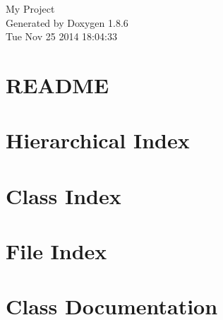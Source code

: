 \documentclass[twoside]{book}
\newcommand{\clearemptydoublepage}{%
  \newpage{\pagestyle{empty}\cleardoublepage}%
}
\begin{document}
\hypersetup{pageanchor=false}
\begin{titlepage}
\vspace*{7cm}
\begin{center}%
{\Large My Project }\\
\vspace*{1cm}
{\large Generated by Doxygen 1.8.6}\\
\vspace*{0.5cm}
{\small Tue Nov 25 2014 18:04:33}\\
\end{center}
\end{titlepage}
\clearemptydoublepage
\tableofcontents
\clearemptydoublepage
{}
\hypersetup{pageanchor=true}

\chapter{R\-E\-A\-D\-M\-E}
\label{md_README}
\hypertarget{md_README}{}

\chapter{Hierarchical Index}

\chapter{Class Index}

\chapter{File Index}

\chapter{Class Documentation}
























\end{document}
